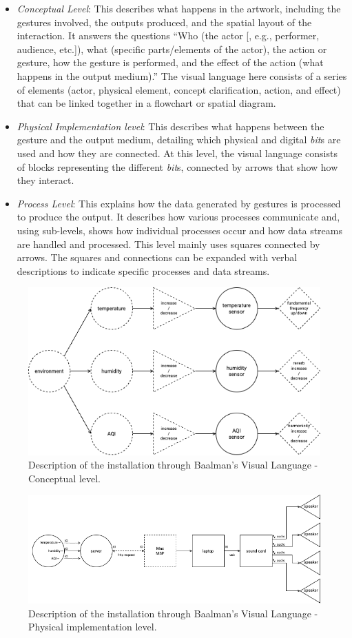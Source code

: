\begin{itemize}
    \item \textit{Conceptual Level}: This describes what happens in the artwork, including the gestures involved, the outputs produced, and the spatial layout of the interaction. It answers the questions ``Who (the actor [, e.g., performer, audience, etc.]), what (specific parts/elements of the actor), the action or gesture, how the gesture is performed, and the effect of the action (what happens in the output medium).'' The visual language here consists of a series of elements (actor, physical element, concept clarification, action, and effect) that can be linked together in a flowchart or spatial diagram.
    \item \textit{Physical Implementation level}: This describes what happens between the gesture and the output medium, detailing which physical and digital \textit{bit}s are used and how they are connected. At this level, the visual language consists of blocks representing the different \textit{bit}s, connected by arrows that show how they interact.
    \item \textit{Process Level}: This explains how the data generated by gestures is processed to produce the output. It describes how various processes communicate and, using sub-levels, shows how individual processes occur and how data streams are handled and processed. This level mainly uses squares connected by arrows. The squares and connections can be expanded with verbal descriptions to indicate specific processes and data streams.
\end{itemize}
\begin{figure}[!h]
    \centering
    \includegraphics[width=0.7\linewidth]{chapters/3-mdc_model-reactivation_workflow-instruction_template/image/graph03-BVLconcept.png}
    \caption{Description of the installation through Baalman’s Visual Language - Conceptual level.}
    \label{fig:c3-BVLconceptual}
\end{figure} 
\begin{figure}[!h]
    \centering
    \includegraphics[width=0.7\linewidth]{chapters/3-mdc_model-reactivation_workflow-instruction_template/image/graph03-BVLphysical.png}
    \caption{Description of the installation through Baalman’s Visual Language - Physical implementation level.}
    \label{fig:c3-BVLphysical}
\end{figure} 
